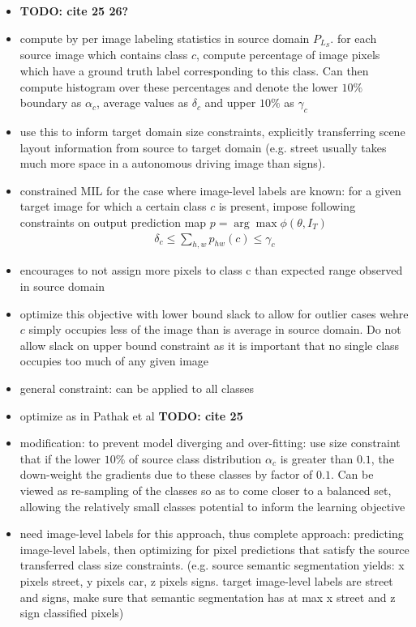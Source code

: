 \documentclass[]{article}
\newcommand{\todo}[1]{{\color{red}\bf{TODO: #1}}}
\begin{document}
\begin{itemize}
	\item \todo{cite 25 26?}
	\item compute by per image labeling statistics in source domain $P_{L_S}$. for each source image which contains class $c$, compute percentage of image pixels which have a ground truth label corresponding to this class. Can then compute histogram over these percentages and denote the lower $10\%$ boundary as $\alpha_c$, average values as $\delta_c$ and upper $10\%$ as $\gamma_c$
	\item use this to inform target domain size constraints, explicitly transferring scene layout information from source to target domain (e.g. street usually takes much more space in a autonomous driving image than signs).
	\item constrained MIL for the case where image-level labels are known: for a given target image for which a certain class $c$ is present, impose following constraints on output prediction map $p = \arg \max \phi (\theta, I_T)$
	\begin{align}
	\delta_c \leq \sum_{h,w} p_{hw}(c) \leq \gamma_c
	\end{align}
	\item encourages to not assign more pixels to class c than expected range observed in source domain
	\item optimize this objective with lower bound slack to allow for outlier cases wehre $c$ simply occupies less of the image than is average in source domain. Do not allow slack on upper bound constraint as it is important that no single class occupies too much of any given image
	\item general constraint: can be applied to all classes 
	\item optimize as in Pathak et al \todo{cite 25}
	\item modification: to prevent model diverging and over-fitting: use size constraint that if the lower $10\%$ of source class distribution $\alpha_c$ is greater than $0.1$, the down-weight the gradients due to these classes by factor of $0.1$. Can be viewed as re-sampling of the classes so as to come closer to a balanced set, allowing the relatively small classes potential to inform the learning objective
	\item need image-level labels for this approach, thus complete approach: predicting image-level labels, then optimizing for pixel predictions that satisfy the source transferred class size constraints. (e.g. source semantic segmentation yields: x pixels street, y pixels car, z pixels signs. target image-level labels are street and signs, make sure that semantic segmentation has at max x street and z sign classified pixels)

\end{itemize}
\end{document}
